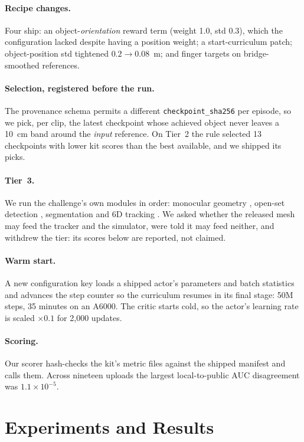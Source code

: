 \documentclass[10pt]{nvidiaextabstract}
\begin{document}
\paragraph{Recipe changes.} Four ship: an object-\emph{orientation} reward term (weight 1.0, std
0.3), which the configuration lacked despite having a position weight; a start-curriculum patch;
object-position std tightened $0.2 \rightarrow 0.08$~m; and finger targets on bridge-smoothed
references.

\paragraph{Selection, registered before the run.} The provenance schema permits a different
\texttt{checkpoint\_sha256} per episode, so we pick, per clip, the latest checkpoint whose achieved
object never leaves a 10~cm band around the \emph{input} reference. On Tier~2 the rule selected 13
checkpoints with lower kit scores than the best available, and we shipped its picks.

\paragraph{Tier~3.} We run the challenge's own modules in order: monocular geometry
\citep{moge}, open-set detection \citep{groundingdino}, segmentation \citep{sam2} and 6D
tracking \citep{foundationpose}. We asked whether the released mesh may feed the tracker and the simulator, were told it may
feed neither, and withdrew the tier: its scores below are reported, not claimed.

\paragraph{Warm start.} A new configuration key loads a shipped actor's parameters and batch
statistics and advances the step counter so the curriculum resumes in its final stage: 50M steps,
35 minutes on an A6000. The critic
starts cold, so the actor's learning rate is scaled $\times 0.1$ for 2{,}000 updates.

\paragraph{Scoring.} Our scorer hash-checks the kit's metric files against the shipped manifest and calls them. Across nineteen uploads the largest
local-to-public AUC disagreement was $1.1\times10^{-5}$.

\section{Experiments and Results}
\label{sec:experiments}
\end{document}
